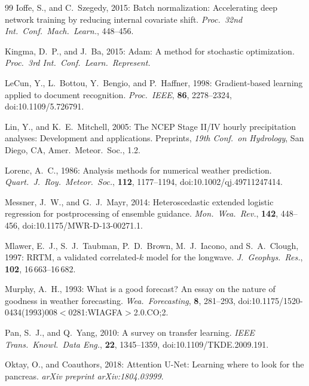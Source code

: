 \documentclass[11pt]{article}
\begin{document}
\begin{thebibliography}{99}
Ioffe, S., and C.\ Szegedy, 2015:
Batch normalization: Accelerating deep network training by
reducing internal covariate shift.
\textit{Proc.\ 32nd Int.\ Conf.\ Mach.\ Learn.}, 448--456.

Kingma, D.~P., and J.\ Ba, 2015:
Adam: A method for stochastic optimization.
\textit{Proc.\ 3rd Int.\ Conf.\ Learn.\ Represent.}

LeCun, Y., L.\ Bottou, Y.\ Bengio, and P.\ Haffner, 1998:
Gradient-based learning applied to document recognition.
\textit{Proc.\ IEEE}, \textbf{86}, 2278--2324,
doi:10.1109/5.726791.

Lin, Y., and K.~E.\ Mitchell, 2005:
The NCEP Stage II/IV hourly precipitation analyses: Development and applications.
Preprints, \textit{19th Conf.\ on Hydrology}, San Diego, CA, Amer.\ Meteor.\ Soc.,
1.2.

Lorenc, A.~C., 1986:
Analysis methods for numerical weather prediction.
\textit{Quart.\ J.\ Roy.\ Meteor.\ Soc.}, \textbf{112}, 1177--1194,
doi:10.1002/qj.49711247414.

Messner, J.~W., and G.~J.\ Mayr, 2014:
Heteroscedastic extended logistic regression for postprocessing of
ensemble guidance.
\textit{Mon.\ Wea.\ Rev.}, \textbf{142}, 448--456,
doi:10.1175/MWR-D-13-00271.1.

Mlawer, E.~J., S.~J.\ Taubman, P.~D.\ Brown, M.~J.\ Iacono,
and S.~A.\ Clough, 1997:
RRTM, a validated correlated-$k$ model for the longwave.
\textit{J.\ Geophys.\ Res.}, \textbf{102}, 16\,663--16\,682.

Murphy, A.~H., 1993:
What is a good forecast? An essay on the nature of goodness in
weather forecasting.
\textit{Wea.\ Forecasting}, \textbf{8}, 281--293,
doi:10.1175/1520-0434(1993)008$<$0281:WIAGFA$>$2.0.CO;2.

Pan, S.~J., and Q.\ Yang, 2010:
A survey on transfer learning.
\textit{IEEE Trans.\ Knowl.\ Data Eng.}, \textbf{22}, 1345--1359,
doi:10.1109/TKDE.2009.191.

Oktay, O., and Coauthors, 2018:
Attention U-Net: Learning where to look for the pancreas.
\textit{arXiv preprint arXiv:1804.03999}.


\end{thebibliography}
\end{document}
